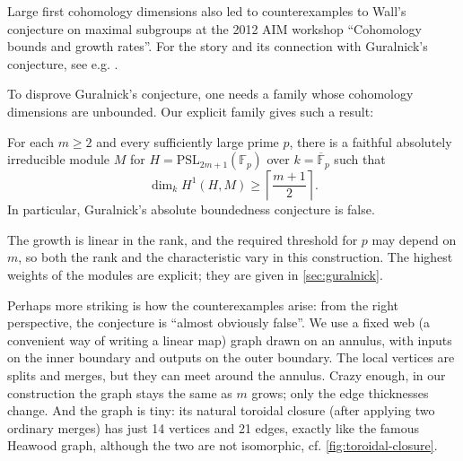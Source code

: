 \documentclass[a4paper,11pt]{amsart}
\numberwithin{equation}{subsection}
\theoremstyle{plain}
\theoremstyle{definition}
\theoremstyle{remark}
\begin{document}
\begin{remark}
Large first cohomology dimensions also led to counterexamples
to Wall's conjecture on maximal subgroups at the 2012 AIM
workshop ``Cohomology bounds and growth rates''.
For the story and its connection with
Guralnick's conjecture, see e.g. \cite{AIMWall,BendelEtAlHistory}.
\end{remark}

To disprove Guralnick's conjecture, one needs a family whose
cohomology dimensions are unbounded. Our explicit family gives such a result:

\begin{corollary}\label{cor:intro-guralnick}
For each $m\ge2$ and every sufficiently large prime $p$, there is a
faithful absolutely irreducible module $M$ for
$H=\mathrm{PSL}_{2m+1}(\mathbb F_p)$ over
$k=\overline{\mathbb F}_p$ such that
\[
\dim_k H^1(H,M)\ge\left\lceil\frac{m+1}{2}\right\rceil.
\]
In particular, Guralnick's absolute boundedness conjecture is false.
\end{corollary}

The growth is linear in the rank, and the required threshold for $p$ may depend on $m$, so both
the rank and the characteristic vary in this construction.
The highest weights of the modules are explicit; they are
given in \autoref{sec:guralnick}.

Perhaps more striking is how the counterexamples arise: from the right perspective, the conjecture is ``almost obviously false''.
We use a fixed web (a convenient way of writing a linear map) graph drawn on an annulus, with inputs on
the inner boundary and outputs on the outer boundary.
The local vertices are splits and merges,
but they can meet around the annulus.
Crazy enough, in our construction the graph stays the same as $m$ grows; only the edge
thicknesses change. And the graph is tiny: its natural toroidal closure 
(after applying two ordinary merges) has just 14 vertices and 21 edges, exactly like the famous Heawood graph, although the two are not isomorphic, cf. \autoref{fig:toroidal-closure}.
\end{document}
